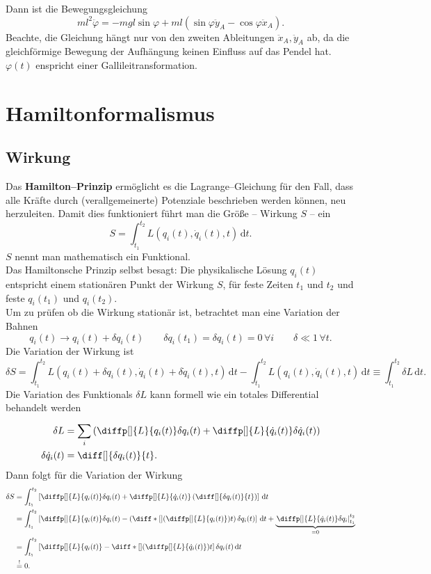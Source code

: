 \documentclass[a4paper,12pt]{article}
\newcommand{\td}{\,\text{d}}
\numberwithin{equation}{section}
\begin{document}
Dann ist die Bewegungsgleichung
\[ 
        ml^2\ddot{\varphi }=-mgl \sin \varphi +ml\left(\sin \varphi \ddot{y}_A-\cos \varphi \ddot{x}_A\right)
.\] 
Beachte, die Gleichung hängt nur von den zweiten Ableitungen $\ddot{x}_A,\ddot{y}_A$ ab, da die gleichförmige Bewegung der Aufhängung keinen Einfluss auf das Pendel hat. $\varphi (t)$ enspricht einer Gallileitransformation.

\newpage
\section{Hamiltonformalismus}
\subsection{Wirkung}
Das \textbf{Hamilton--Prinzip} ermöglicht es die Lagrange--Gleichung für den Fall, dass alle Kräfte durch (verallgemeinerte) Potenziale beschrieben werden können, neu herzuleiten. Damit dies funktioniert führt man die Größe -- Wirkung $S$ -- ein
\[ 
        S=\int_{t_1}^{t_2}L(q_i(t),\dot{q}_i(t),t)\td t
.\] 
$S$ nennt man mathematisch ein Funktional.\\\indent
Das Hamiltonsche Prinzip selbst besagt: Die physikalische Lösung $q_i(t)$ entspricht einem stationären Punkt der Wirkung $S$, für feste Zeiten $t_1$ und $t_2$ und feste $q_i(t_1)$ und $q_i(t_2)$.\\\indent
Um zu prüfen ob die Wirkung stationär ist, betrachtet man eine Variation der Bahnen
\[ 
        q_i(t)\rightarrow q_i(t)+\delta q_i(t)\qquad \delta q_i(t_1)=\delta q_i(t)=0\,\forall i\qquad \delta \ll 1\,\forall t
.\] 
Die Variation der Wirkung ist
\[ 
        \delta S=\int_{t_1}^{t_2}L(q_i(t)+\delta q_i(t),\dot{q}_i(t)+\delta \dot{q}_i(t),t)\td t-\int_{t_1}^{t_2}L(q_i(t),\dot{q}_i(t),t)\td t\equiv \int_{t_1}^{t_2}\delta L\td t
.\] 
Die Variation des Funktionals $\delta L$ kann formell wie ein totales Differential behandelt werden
\begin{align*}
        \delta L&=\sum_{i}^{}\left(\diffp[]{L}{q_i(t)}\delta q_i(t)+\diffp[]{L}{\dot{q}_i(t)}\delta \dot{q}_i(t)\right)\\
        \delta \dot{q}_i(t)&=\diff[]{\delta q_i(t)}{t}
.\end{align*}
Dann folgt für die Variation der Wirkung
\begin{align*}
        \delta S&=\int_{t_1}^{t_2}\left[\diffp[]{L}{q_i(t)}\delta q_i(t)+\diffp[]{L}{\dot{q}_i(t)}\left(\diff[]{\delta q_i(t)}{t}\right)\right]\td t\\
                &=\int_{t_1}^{t_2}\left[\diffp[]{L}{q_i(t)}\delta q_i(t)-\left(\diff*[]{\left(\diffp[]{L}{q_i(t)}\right)}{t}\right)\delta q_i(t)\right]\td t+\underbrace{\left.\diffp[]{L}{\dot{q}_i(t)}\delta q_i\right|_{t_1}^{t_2}}_{=0}\\
                &=\int_{t_1}^{t_2}\left[\diffp[]{L}{q_i(t)}-\diff*[]{\left(\diffp[]{L}{\dot{q}_i(t)}\right)}{t}\right]\delta q_i(t)\td t\\
                &\stackrel{!}{=}0
.\end{align*}
\end{document}
